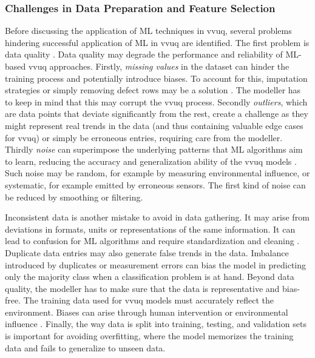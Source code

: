 \subsubsection*{Challenges in Data Preparation and Feature Selection}

Before discussing the application of ML techniques in \gls{vvuq}, several problems hindering successful application of ML in \gls{vvuq} are identified. The first problem is data quality \autocite{wu2025uncertainty}. Data quality may degrade the performance and reliability of ML-based \gls{vvuq} approaches. Firstly, \textit{missing values} in the dataset can hinder the training process and potentially introduce biases. To account for this, imputation strategies or simply removing defect rows may be a solution \autocite{gudivada2017data}. The modeller has to keep in mind that this may corrupt the \gls{vvuq} process. Secondly \textit{outliers}, which are data points that deviate significantly from the rest, create a challenge as they might represent real trends in the data (and thus containing valuable edge cases for \gls{vvuq}) or simply be erroneous entries, requiring care from the modeller. Thirdly \textit{noise} can superimpose the underlying patterns that ML algorithms aim to learn, reducing the accuracy and generalization ability of the \gls{vvuq} models \autocite{liu2020noise}. Such noise may be random, for example by measuring environmental influence, or systematic, for example emitted by erroneous sensors. The first kind of noise can be reduced by smoothing or filtering.

Inconsistent data is another mistake to avoid in data gathering. It may arise from deviations in formats, units or representations of the same information. It can lead to confusion for ML algorithms and require standardization and cleaning \autocite{mahanthappa2021data}. Duplicate data entries may also generate false trends in the data. Imbalance introduced by duplicates or measurement errors can bias the model in predicting only the majority class when a classification problem is at hand.
Beyond data quality, the modeller has to make sure that the data is representative and bias-free. The training data used for \gls{vvuq} models must accurately reflect the environment. Biases can arise through human intervention or environmental influence \autocite{liu2020noise}. Finally, the way data is split into training, testing, and validation sets is important for avoiding overfitting, where the model memorizes the training data and fails to generalize to unseen data.

